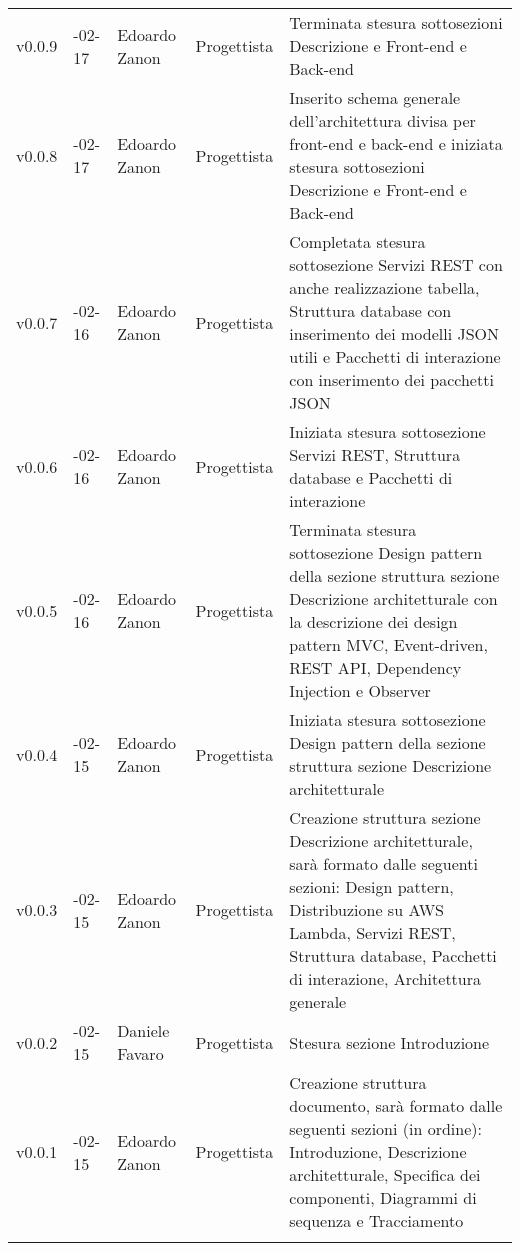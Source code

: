 \begin{longtable} { >{\centering}p{1.4cm} >{\centering}p{2cm} >{\centering}p{2.3cm} >{\centering}p{2.7cm} p{5.5cm} }
	\addlinespace[0.4em]
	\midrule
	\addlinespace[0.4em]
	v0.0.9 & 2017-02-17 &  Edoardo Zanon & Progettista & Terminata stesura sottosezioni Descrizione e Front-end e Back-end \\
	\addlinespace[0.4em]
	\midrule
	\addlinespace[0.4em]
	v0.0.8 & 2017-02-17 &  Edoardo Zanon & Progettista & Inserito schema generale dell'architettura divisa per front-end e back-end e iniziata stesura sottosezioni Descrizione e Front-end e Back-end \\
	\addlinespace[0.4em]
	\midrule
	\addlinespace[0.4em]
	v0.0.7 & 2017-02-16 &  Edoardo Zanon & Progettista & Completata stesura sottosezione Servizi REST con anche realizzazione tabella, Struttura database con inserimento dei modelli JSON utili e Pacchetti di interazione con inserimento dei pacchetti JSON \\
	\addlinespace[0.4em]
	\midrule
	\addlinespace[0.4em]
	v0.0.6 & 2017-02-16 &  Edoardo Zanon & Progettista & Iniziata stesura sottosezione Servizi REST, Struttura database e Pacchetti di interazione  \\
	\addlinespace[0.4em]
	\midrule
	\addlinespace[0.4em]
	v0.0.5 & 2017-02-16 &  Edoardo Zanon & Progettista & Terminata stesura sottosezione Design pattern della sezione struttura sezione Descrizione architetturale con la descrizione dei design pattern MVC, Event-driven, REST API, Dependency Injection e Observer  \\
	\addlinespace[0.4em]
	\midrule
	\addlinespace[0.4em]
	v0.0.4 & 2017-02-15 &  Edoardo Zanon & Progettista & Iniziata stesura sottosezione Design pattern della sezione struttura sezione Descrizione architetturale  \\
	\addlinespace[0.4em]
	\midrule
	\addlinespace[0.4em]
	v0.0.3 & 2017-02-15 &  Edoardo Zanon & Progettista & Creazione struttura sezione Descrizione architetturale, sarà formato dalle seguenti sezioni: Design pattern, Distribuzione su AWS Lambda, Servizi REST, Struttura database, Pacchetti di interazione, Architettura generale  \\
	\addlinespace[0.4em]
	\midrule
	\addlinespace[0.4em]
	v0.0.2 & 2017-02-15 &  Daniele Favaro & Progettista & Stesura sezione Introduzione  \\
	\addlinespace[0.4em]
	\midrule
	\addlinespace[0.4em]
	v0.0.1 & 2017-02-15 &  Edoardo Zanon & Progettista & Creazione struttura documento, sarà formato dalle seguenti sezioni (in ordine): Introduzione, Descrizione architetturale, Specifica dei componenti, Diagrammi di sequenza e Tracciamento  \\
	\arrayrulecolor{black}
	\addlinespace[0.5em]
	\bottomrule
\end{longtable}
